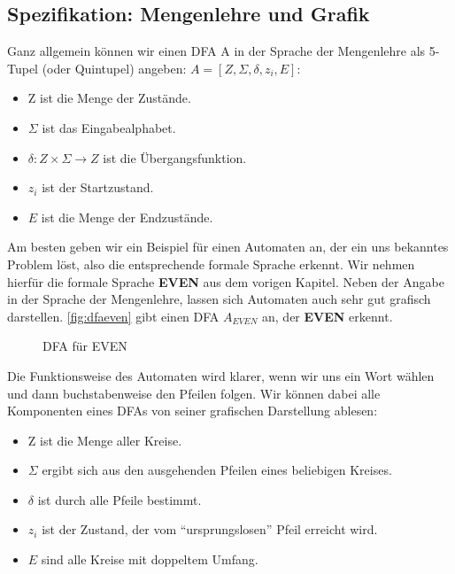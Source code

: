 \subsection{Spezifikation: Mengenlehre und Grafik}
Ganz allgemein können wir einen DFA A in der Sprache der Mengenlehre
als 5-Tupel (oder Quintupel) angeben: $A = [Z, \Sigma, \delta, z_i, E]$:
\begin{itemize}
    \item Z ist die Menge der Zustände.
    \item $\Sigma$ ist das Eingabealphabet.
    \item $\delta: Z \times \Sigma \rightarrow Z$ ist die Übergangsfunktion.
    \item $z_i$ ist der Startzustand.
    \item $E$ ist die Menge der Endzustände.
\end{itemize}

Am besten geben wir ein Beispiel für einen Automaten an,
der ein uns bekanntes Problem löst,
also die entsprechende formale Sprache erkennt.
Wir nehmen hierfür die formale Sprache \textbf{EVEN} aus dem vorigen Kapitel.
Neben der Angabe in der Sprache der Mengenlehre,
lassen sich Automaten auch sehr gut grafisch darstellen.
\autoref{fig:dfaeven} gibt einen DFA $A_{EVEN}$ an,
der \textbf{EVEN} erkennt.

\begin{figure}[ht] %
\centering %
\caption{DFA für EVEN}
\label{fig:dfaeven}
\end{figure}

Die Funktionsweise des Automaten wird klarer, wenn wir uns ein Wort wählen
und dann buchstabenweise den Pfeilen folgen.
Wir können dabei alle Komponenten eines DFAs von seiner grafischen Darstellung ablesen:
\begin{itemize}
    \item Z ist die Menge aller Kreise.
    \item $\Sigma$ ergibt sich aus den ausgehenden Pfeilen eines beliebigen Kreises.
    \item $\delta$ ist durch alle Pfeile bestimmt.
    \item $z_i$ ist der Zustand,
        der vom ``ursprungslosen'' Pfeil erreicht wird.
    \item $E$ sind alle Kreise mit doppeltem Umfang.
\end{itemize}

